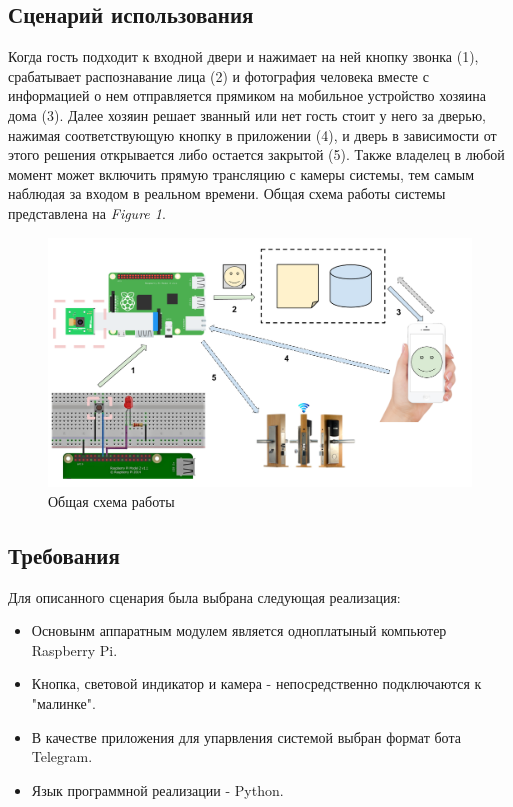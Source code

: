 \documentclass[a4paper,11pt]{article}
\begin{document}
\subsection{Сценарий использования}
\noindent Когда гость подходит к входной двери и нажимает на ней кнопку звонка (1), срабатывает распознавание лица (2) и фотография человека вместе с информацией о нем отправляется прямиком на мобильное устройство хозяина дома (3). Далее хозяин решает званный или нет гость стоит у него за дверью, нажимая соответствующую кнопку в приложении (4), и дверь в зависимости от этого решения открывается либо остается закрытой (5). Также владелец в любой момент может включить прямую трансляцию с камеры системы, тем самым наблюдая за входом в реальном времени. Общая схема работы системы представлена на \textit{Figure 1}.
\begin{center}
  \begin{figure}[h]
    \includegraphics[scale=0.4]{images/Рисунок 1.png}
    \caption{Общая схема работы}
  \end{figure}
\end{center}

\subsection{Требования}
\noindent Для описанного сценария была выбрана следующая реализация:
\begin{itemize}
  \item Основынм аппаратным модулем является одноплатыный компьютер Raspberry Pi.
  \item Кнопка, световой индикатор и камера - непосредственно подключаются к "малинке".
  \item В качестве приложения для упарвления системой выбран формат бота Telegram.
  \item Язык программной реализации - Python.
\end{itemize}
\end{document}
